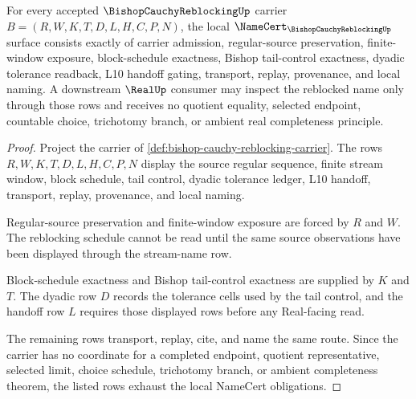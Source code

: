 \begin{theorem}
\label{thm:bishop-cauchy-reblocking-namecert-obligations}
For every accepted $\BishopCauchyReblockingUp$ carrier $B=(R,W,K,T,D,L,H,C,P,N)$, the local $\NameCert_{\BishopCauchyReblockingUp}$ surface consists exactly of carrier admission, regular-source preservation, finite-window exposure, block-schedule exactness, Bishop tail-control exactness, dyadic tolerance readback, L10 handoff gating, transport, replay, provenance, and local naming. A downstream $\RealUp$ consumer may inspect the reblocked name only through those rows and receives no quotient equality, selected endpoint, countable choice, trichotomy branch, or ambient real completeness principle.
\end{theorem}
\begin{proof}
Project the carrier of \autoref{def:bishop-cauchy-reblocking-carrier}. The rows $R,W,K,T,D,L,H,C,P,N$ display the source regular sequence, finite stream window, block schedule, tail control, dyadic tolerance ledger, L10 handoff, transport, replay, provenance, and local naming.

Regular-source preservation and finite-window exposure are forced by $R$ and $W$. The reblocking schedule cannot be read until the same source observations have been displayed through the stream-name row.

Block-schedule exactness and Bishop tail-control exactness are supplied by $K$ and $T$. The dyadic row $D$ records the tolerance cells used by the tail control, and the handoff row $L$ requires those displayed rows before any Real-facing read.

The remaining rows transport, replay, cite, and name the same route. Since the carrier has no coordinate for a completed endpoint, quotient representative, selected limit, choice schedule, trichotomy branch, or ambient completeness theorem, the listed rows exhaust the local NameCert obligations.
\end{proof}

